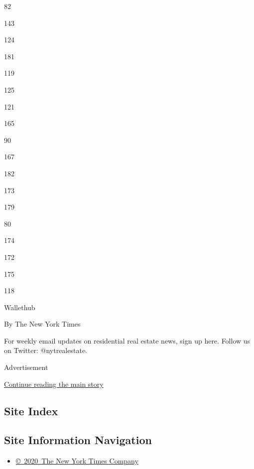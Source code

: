 82

143

124

181

119

125

121

165

90

167

182

173

179

80

174

172

175

118

Wallethub

By The New York Times

For weekly email updates on residential real estate news, sign up here.
Follow us on Twitter: @nytrealestate.

Advertisement

\protect\hyperlink{after-bottom}{Continue reading the main story}

\hypertarget{site-index}{%
\subsection{Site Index}\label{site-index}}

\hypertarget{site-information-navigation}{%
\subsection{Site Information
Navigation}\label{site-information-navigation}}

\begin{itemize}
\tightlist
\item
  \href{https://help.nytimes.com/hc/en-us/articles/115014792127-Copyright-notice}{©~2020~The
  New York Times Company}
\end{itemize}

